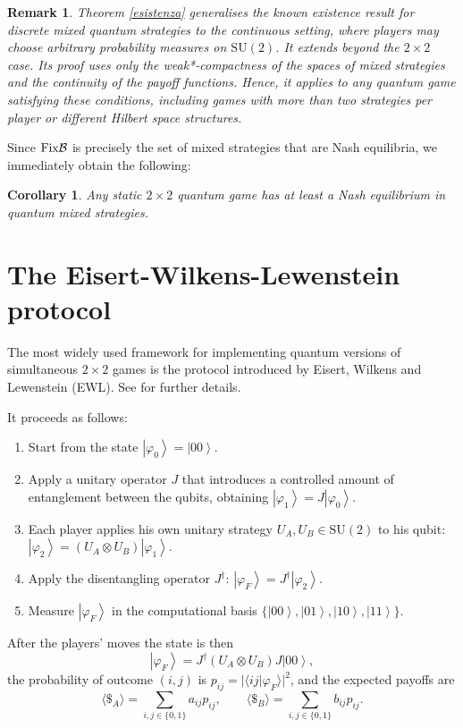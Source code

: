 \documentclass[11pt,a4paper,twoside]{article}
\newcommand{\SU}{\mathrm{SU}}
\newcommand{\ket}[1]{\left| #1 \right\rangle} %
\newcommand{\braket}[1]{\langle #1 \rangle} %
\newtheorem{corollary}[definition]{Corollary}
\newtheorem{rem}[definition]{Remark}
\newenvironment{remark}{\begin{rem}  \rm }{\end{rem}}
\begin{document}
\begin{remark}\rm
Theorem \ref{esistenza} generalises the known existence result for discrete mixed quantum strategies \cite{lee} to the continuous setting, where players may choose arbitrary probability measures on $\mathrm{SU}(2)$. It extends beyond the $2\times2$ case. Its proof uses only the weak*-compactness of the spaces of mixed strategies and the continuity of the payoff functions. Hence, it applies to any quantum game satisfying these conditions, including games with more than two strategies per player or different Hilbert space structures.
\end{remark}


Since ${\rm Fix}\mathcal{B}$ is precisely the set of mixed strategies that are Nash equilibria, we immediately obtain the following:
\begin{corollary} \label{cor:Nash}
    Any static $2\times 2$ quantum game has at least a Nash equilibrium in quantum mixed strategies.
\end{corollary}

\section{The Eisert-Wilkens-Lewenstein protocol}
The most widely used framework for implementing quantum versions of simultaneous $2\times2$ games is the protocol introduced by Eisert, Wilkens and Lewenstein (EWL).  See \cite{eisert_quantum} for further details.

It proceeds as follows:
\begin{enumerate}
\item Start from the state \(\ket{\varphi_0}=\ket{00}\).
\item Apply a unitary operator \(J\) that introduces a controlled amount of entanglement between the qubits, obtaining \(\ket{\varphi_1}=J\ket{\varphi_0}\).
\item Each player applies his own unitary strategy \(U_A,U_B\in\SU(2)\) to his qubit:
   \(\ket{\varphi_2}=(U_A\otimes U_B)\ket{\varphi_1}\).
\item Apply the disentangling operator \(J^\dagger\):
   \(\ket{\varphi_F}=J^\dagger\ket{\varphi_2}\).
\item Measure \(\ket{\varphi_F}\) in the computational basis \(\{\ket{00},\ket{01},\ket{10},\ket{11}\}\).
\end{enumerate}   

After the players' moves the state is then 
\begin{equation}\label{final-state}
\ket{\varphi_F}=J^\dagger(U_A\otimes U_B)J\ket{00},
\end{equation}
the probability of outcome \((i,j)\) is $p_{ij}=|\braket{ij|\varphi_F}|^2$, and the expected payoffs are
   \[
   \langle\$_{A}\rangle=\sum_{i,j\in\{0,1\}} a_{ij}p_{ij},\qquad
   \langle\$_{B}\rangle=\sum_{i,j\in\{0,1\}} b_{ij}p_{ij}.
\]
\end{document}
